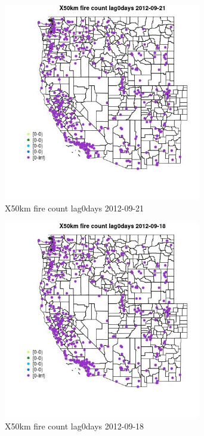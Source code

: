 \begin{figure} 
\centering  
\includegraphics[width=0.77\textwidth]{Code_Outputs/Report_ML_input_PM25_Step4_part_e_de_duplicated_aves_compiled_2019-05-14wNAs_MapObsX50km_fire_count_lag0days2012-09-21.jpg} 
\caption{\label{fig:Report_ML_input_PM25_Step4_part_e_de_duplicated_aves_compiled_2019-05-14wNAsMapObsX50km_fire_count_lag0days2012-09-21}X50km fire count lag0days 2012-09-21} 
\end{figure} 
 

\clearpage 

\begin{figure} 
\centering  
\includegraphics[width=0.77\textwidth]{Code_Outputs/Report_ML_input_PM25_Step4_part_e_de_duplicated_aves_compiled_2019-05-14wNAs_MapObsX50km_fire_count_lag0days2012-09-18.jpg} 
\caption{\label{fig:Report_ML_input_PM25_Step4_part_e_de_duplicated_aves_compiled_2019-05-14wNAsMapObsX50km_fire_count_lag0days2012-09-18}X50km fire count lag0days 2012-09-18} 
\end{figure} 
 

